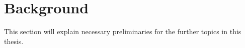 \section{Background} \label{background}

This section will explain necessary preliminaries for the further topics in this thesis.






